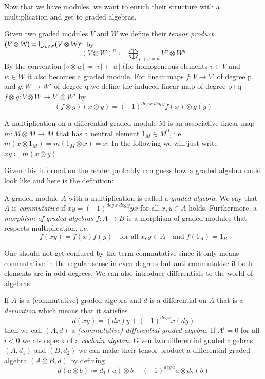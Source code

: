 Now that we have modules, we want to enrich their structure with a multiplication and get to graded algebras.

\begin{Definition}
 Given two graded modules $V$ and $W$ we define their \emph{tensor product} \newline
 ${(V \otimes W) = \bigcup_{n \in \mathbb{Z}} (V \otimes W)^n }$ by 
 $$ (V \otimes W)^n \coloneqq \bigoplus_{p + q = n} V^p \otimes W^q$$
 By the convention $|v \otimes w| \coloneqq |v| + |w|$ (for homogeneous elements $v \in V$ and $w \in W$
 it also becomes a graded module. \newline
 For linear maps $f \colon V \to V'$ of degree p and $g \colon W \to W'$ of degree q we define the induced linear map
 of degree p+q \;  ${f \otimes g \colon V \otimes W \to V' \otimes W'}$ by
 $$ (f \otimes g) ( x \otimes y) = (-1)^{deg \, x \; deg \,y} f(x) \otimes g(y) $$

 A multiplication on a differential graded module M is an associative linear map \newline
 ${m \colon M \otimes M \to M }$ that has a neutral element $1_M \in M^0$, i.e.\ $m(x \otimes 1_M) = m(1_M \otimes x) = x$.
 In the following we will just write $xy \coloneqq m(x \otimes y)$.
 \end{Definition}

 Given this information the reader probably can guess how a graded algebra could look like and here is the definition:
\begin{Definition}
 A graded module $A$ with a multiplication is called a \emph{graded algebra}. We say that $A$ is \emph{commutative} if
 $xy = (-1)^{deg \, x \; deg \, y} yx$ for all $x,y \in A$ holds. Furthermore, a \emph{morphism of graded algebras} 
 $f \colon A \to B$ is a morphism of graded modules that respects multiplication, i.e.\ 
 $$f(xy) = f(x)f(y) \quad \text{for all} \; x,y \in A \quad \text{and} \; f(1_A) = 1_B $$
\end{Definition}

One should not get confused by the term commutative since it only means commutative in the regular sense in even degrees but
anti commutative if both elements are in odd degrees.
We can also introduce differentials to the world of algebras:
\begin{Definition}
 If $A$ is a (commutative) graded algebra and $d$ is a differential on $A$ that is a \emph{derivation} which means
 that it satisfies 
 $$ d(xy) = (dx)y + (-1)^{deg x} x(dy)$$
 then we call $(A,d)$ a \emph{(commutative) differential graded algebra}. If $A^i = 0$ for all $i < 0$ we also
 speak of a \emph{cochain algebra}. \newline
 Given two differential graded algebras $(A,d_1)$ and $(B, d_2)$ we can make their tensor product a 
 differential graded algebra $(A \otimes B, d)$ by defining 
 $$ d(a \otimes b) \coloneqq d_1(a) \otimes b + (-1)^{deg \, a} a \otimes d_2(b)$$
\end{Definition}

